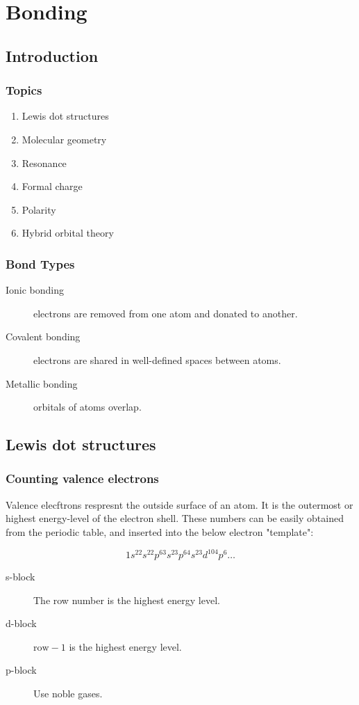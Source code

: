 \chapter{Bonding}
\section{Introduction}
\subsection{Topics}
\begin{enumerate}
  \item Lewis dot structures
  \item Molecular geometry
  \item Resonance
  \item Formal charge
  \item Polarity
  \item Hybrid orbital theory
\end{enumerate}

\subsection{Bond Types}
\begin{description}
  \item[Ionic bonding] electrons are removed from one atom and donated to
    another.
  \item[Covalent bonding] electrons are shared in well-defined spaces between
    atoms.
  \item[Metallic bonding] orbitals of atoms overlap.
\end{description}

\section{Lewis dot structures}
\subsection{Counting valence electrons}
Valence elecftrons respresnt the outside surface of an atom. It is the outermost
or highest energy-level of the electron shell. These numbers can be easily
obtained from the periodic table, and inserted into the below electron
"template":

$$1s^22s^22p^63s^23p^64s^23d^104p^6 \ldots$$

\begin{description}
  \item[s-block] The row number is the highest energy level.
  \item[d-block] $\text{row}-1$ is the highest energy level.
  \item[p-block] Use noble gases.
\end{description}

